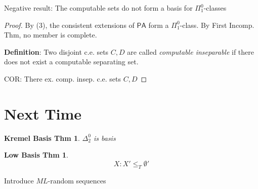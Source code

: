 \documentclass[12pt]{article}
\newcommand{\PA}{\ensuremath{\mathsf{PA}}}
\newcommand{\defn}{\textbf{Definition}: }
\begin{document}
Negative result:
The computable sets do not form a basis for $\Pi^0_1$-classes
\begin{proof}
  By (3), the consistent extensions of $\PA$ form a $\Pi^0_1$-class.
  By First Incomp. Thm, no member is complete.

  \defn Two disjoint c.e. sets $C,D$ are called \emph{computable inseparable}
  if there does not exist a computable separating set.

  COR: There ex. comp. insep. c.e. sets $C,D$
\end{proof}


\section{Next Time}

\newtheorem*{krem}{Kremel Basis Thm}
\begin{krem}
  $\Delta^0_2$ is basis
\end{krem}
\newtheorem*{low}{Low Basis Thm}
\begin{low}
  \[
X : X' \le_T \emptyset'
  \]
\end{low}

Introduce $ML$-random sequences
\end{document}
